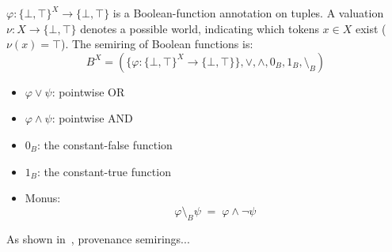 \documentclass[twocolumn]{article}
\begin{document}
\(\varphi\colon \{\bot,\top\}^X \to \{\bot,\top\}\) is a Boolean-function annotation on tuples.
A valuation \(\nu\colon X \to \{\bot,\top\}\) denotes a possible world,
  indicating which tokens \(x\in X\) exist (\(\nu(x)=\top\)).
The semiring of Boolean functions is:
$$
B^X = (\{\varphi : \{ \bot,\top \}^X \to \{\bot,\top\}\},\vee,\wedge,0_B,1_B,\setminus_B)
$$
\begin{itemize}
    \item \(\varphi \vee \psi\): pointwise OR
    \item \(\varphi \wedge \psi\): pointwise AND
    \item \(0_B\): the constant-false function
    \item \(1_B\): the constant-true function
    \item Monus:
        $$
        \varphi \setminus_B \psi \;=\; \varphi \wedge \neg \psi
        $$
\end{itemize}



As shown in~\cite{amsterdamer2011provenance}, provenance semirings...



\end{document}
